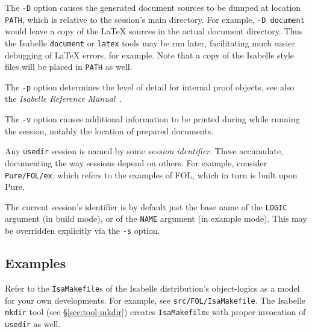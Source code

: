 \medskip The \texttt{-D} option causes the generated document sources to be
dumped at location \texttt{PATH}, which is relative to the session's main
directory.  For example, \texttt{-D document} would leave a copy of the
{\LaTeX} sources in the actual document directory.  Thus the Isabelle
\texttt{document} or \texttt{latex} tools may be run later, facilitating much
easier debugging of {\LaTeX} errors, for example.  Note that a copy of the
Isabelle style files will be placed in \texttt{PATH} as well.

\medskip The \texttt{-p} option determines the level of detail for internal
proof objects, see also the \emph{Isabelle Reference
  Manual}~\cite{isabelle-ref}.

\medskip The \texttt{-v} option causes additional information to be printed
during while running the session, notably the location of prepared documents.

\medskip Any \texttt{usedir} session is named by some \emph{session
  identifier}. These accumulate, documenting the way sessions depend on
others. For example, consider \texttt{Pure/FOL/ex}, which refers to the
examples of FOL, which in turn is built upon Pure.

The current session's identifier is by default just the base name of the
\texttt{LOGIC} argument (in build mode), or of the \texttt{NAME} argument (in
example mode). This may be overridden explicitly via the \texttt{-s} option.


\subsection*{Examples}

Refer to the \texttt{IsaMakefile}s of the Isabelle distribution's
object-logics as a model for your own developments.  For example, see
\texttt{src/FOL/IsaMakefile}.  The Isabelle \texttt{mkdir} tool (see
\S\ref{sec:tool-mkdir}) creates \texttt{IsaMakefile}s with proper invocation
of \texttt{usedir} as well.

